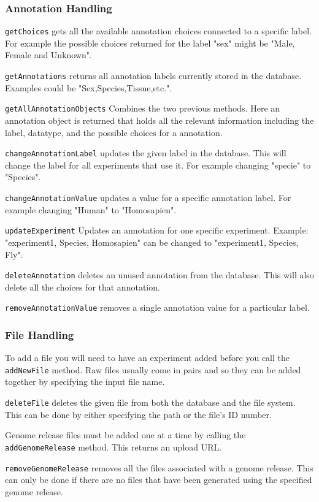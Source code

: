 \subsubsection{Annotation Handling}

\texttt{getChoices} gets all the available annotation choices connected to a specific label. For example the possible choices returned for the label "sex" might be "Male, Female and Unknown".

\texttt{getAnnotations} returns all annotation labels currently stored in the database. Examples could be "Sex,Species,Tissue,etc.".

\texttt{getAllAnnotationObjects} Combines the two previous methods. Here an annotation object is returned that holds all the relevant information including the label, datatype, and the possible choices for a  annotation.

\texttt{changeAnnotationLabel} updates the given label in the database. This will change the label for all experiments that use it. For example changing "specie" to "Species".

\texttt{changeAnnotationValue} updates a value for a specific annotation label. For example changing "Human" to "Homosapien".

\texttt{updateExperiment} Updates an annotation for one specific experiment. Example: "experiment1, Species, Homosapien" can be changed to "experiment1, Species, Fly".

\texttt{deleteAnnotation} deletes an unused annotation from the database. This will also delete all the choices for that annotation. 

\texttt{removeAnnotationValue} removes a single annotation value for a particular label.

\subsubsection{File Handling}
To add a file you will need to have an experiment added before you call the \texttt{addNewFile} method. Raw files usually come in pairs and so they can be added together by specifying the input file name.

\texttt{deleteFile} deletes the given file from both the database and the file system. This can be done by either specifying the path or the file's ID number.

Genome release files must be added one at a time by calling the \texttt{addGenomeRelease} method. This returns an upload URL.

\texttt{removeGenomeRelease} removes all the files associated with a genome release. This can only be done if there are no files that have been generated using the specified genome release.